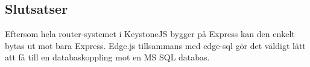 \subsection{Slutsatser}
Eftersom hela router-systemet i KeystoneJS bygger på Express kan den enkelt bytas ut mot bara Express. Edge.js tillsammans med edge-sql gör det väldigt lätt att få till en databaskoppling mot en MS SQL databas.
